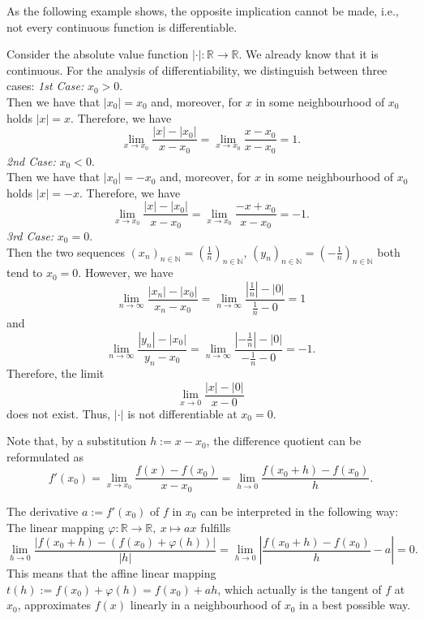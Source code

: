 As the following example shows, the opposite implication cannot be made, i.e., not every continuous function is differentiable.

\begin{example}
    Consider the absolute value function $|\cdot|:\mathbb{R}\to\mathbb{R}$. We already know that it is continuous. For the analysis of differentiability, we distinguish between three cases:
{\em 1st Case:} $x_0>0$.\\
Then we have that $|x_0|=x_0$ and, moreover, for $x$ in some neighbourhood of $x_0$ holds $|x|=x$. Therefore, we have
\[\lim_{x\to x_0}\frac{|x|-|x_0|}{x-x_0}=\lim_{x\to x_0}\frac{x-x_0}{x-x_0}=1.\]
{\em 2nd Case:} $x_0<0$.\\
Then we have that $|x_0|=-x_0$ and, moreover, for $x$ in some neighbourhood of $x_0$ holds $|x|=-x$. Therefore, we have
\[\lim_{x\to x_0}\frac{|x|-|x_0|}{x-x_0}=\lim_{x\to x_0}\frac{-x+x_0}{x-x_0}=-1.\]
{\em 3rd Case:} $x_0=0$.\\
Then the two sequences $(x_n)_{n\in\mathbb{N}}=(\frac1n)_{n\in\mathbb{N}}$, $(y_n)_{n\in\mathbb{N}}=(-\frac1n)_{n\in\mathbb{N}}$ both tend to $x_0=0$. However, we have
\[\lim_{n\to \infty}\frac{|x_n|-|x_0|}{x_n-x_0}=
\lim_{n\to \infty}\frac{|\frac1n|-|0|}{\frac1n-0}=1\]
and
\[\lim_{n\to \infty}\frac{|y_n|-|x_0|}{y_n-x_0}=
\lim_{n\to \infty}\frac{|-\frac1n|-|0|}{-\frac1n-0}=-1.\]
Therefore, the limit
\[\lim_{x\to 0}\frac{|x|-|0|}{x-0}\]
does not exist. Thus, $|\cdot|$ is not differentiable at $x_0=0$.
\end{example}

Note that, by a substitution $h:=x-x_0$, the difference quotient can be reformulated as
\[f'(x_0)=\lim_{x\to x_0}\frac{f(x)-f(x_0)}{x-x_0}=\lim_{h\to 0}\frac{f(x_0+h)-f(x_0)}{h}.\]

The derivative $a:=f'(x_0)$ of $f$ in $x_0$ can be interpreted in the following way:
The linear mapping $\varphi:\mathbb{R}\rightarrow\mathbb{R},\ x\mapsto ax$ fulfills
$$\lim_{h\rightarrow 0}\frac{|f(x_0 + h)-(f(x_0)+\varphi(h))|}{|h|}=\lim_{h\rightarrow 0}\left|\frac{f(x_0+h)-f(x_0)}{h} - a \right| = 0.$$
This means that the affine linear mapping $t(h):=f(x_0)+\varphi(h)=f(x_0)+ah$, which actually is the tangent of $f$ at $x_0$,
approximates $f(x)$ linearly in a neighbourhood of $x_0$ in a best possible way. 

